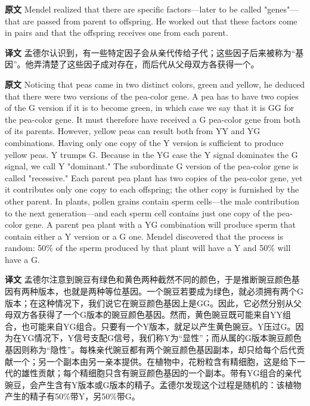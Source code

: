 \documentclass[UTF8,zihao=-4]{ctexart}
\newcommand{\BodyFont}{\fontsize{10.5pt}{15.5pt}\selectfont}
\renewenvironment{quote}{\par\noindent\begingroup\BodyFont}{\par\endgroup}
\begin{document}
\begin{quote}
\noindent\textbf{原文} Mendel realized that there are specific factors---later to be called "genes"---that are passed from parent to offspring. He worked out that these factors come in pairs and that the offspring receives one from each parent.

\smallskip
\noindent\textbf{译文} 孟德尔认识到，有一些特定因子会从亲代传给子代；这些因子后来被称为“基因”。他弄清楚了这些因子成对存在，而后代从父母双方各获得一个。
\end{quote}

\begin{quote}
\noindent\textbf{原文} Noticing that peas came in two distinct colors, green and yellow, he deduced that there were two versions of the pea-color gene. A pea has to have two copies of the G version if it is to become green, in which case we say that it is GG for the pea-color gene. It must therefore have received a G pea-color gene from both of its parents. However, yellow peas can result both from YY and YG combinations. Having only one copy of the Y version is sufficient to produce yellow peas. Y trumps G. Because in the YG case the Y signal dominates the G signal, we call Y "dominant." The subordinate G version of the pea-color gene is called "recessive." Each parent pea plant has two copies of the pea-color gene, yet it contributes only one copy to each offspring; the other copy is furnished by the other parent. In plants, pollen grains contain sperm cells---the male contribution to the next generation---and each sperm cell contains just one copy of the pea-color gene. A parent pea plant with a YG combination will produce sperm that contain either a Y version or a G one. Mendel discovered that the process is random: 50\% of the sperm produced by that plant will have a Y and 50\% will have a G.

\smallskip
\noindent\textbf{译文} 孟德尔注意到豌豆有绿色和黄色两种截然不同的颜色，于是推断豌豆颜色基因有两种版本，也就是两种等位基因。一个豌豆若要成为绿色，就必须拥有两个G版本；在这种情况下，我们说它在豌豆颜色基因上是GG。因此，它必然分别从父母双方各获得了一个G版本的豌豆颜色基因。然而，黄色豌豆既可能来自YY组合，也可能来自YG组合。只要有一个Y版本，就足以产生黄色豌豆。Y压过G。因为在YG情况下，Y信号支配G信号，我们称Y为“显性”；而从属的G版本豌豆颜色基因则称为“隐性”。每株亲代豌豆都有两个豌豆颜色基因副本，却只给每个后代贡献一个；另一个副本由另一亲本提供。在植物中，花粉粒含有精细胞，这是给下一代的雄性贡献；每个精细胞只含有豌豆颜色基因的一个副本。带有YG组合的亲代豌豆，会产生含有Y版本或G版本的精子。孟德尔发现这个过程是随机的：该植物产生的精子有50\%带Y，另50\%带G。
\end{quote}
\end{document}
